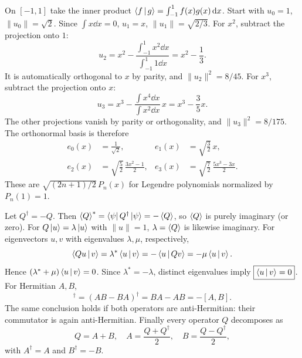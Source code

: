 On $[-1,1]$ take the inner product
$\left\langle f\,\middle|\,g\right\rangle=\int_{-1}^1 f(x)g(x)\,\mathrm{d} x$.
Start with $u_0=1$, $\|u_0\|=\sqrt2$.
Since $\int x\dd x=0$, $u_1=x$,
$\|u_1\|=\sqrt{2/3}$.
For $x^2$, subtract the projection onto $1$:
\begin{equation}
u_2=x^2-\frac{\int_{-1}^1x^2\dd x}
{\int_{-1}^1 1\dd x}=x^2-\frac13.
\end{equation}
It is automatically orthogonal to $x$ by parity,
and $\|u_2\|^2=8/45$.
For $x^3$, subtract the projection onto $x$:
\begin{equation}
u_3=x^3-\frac{\int x^4\dd x}
{\int x^2\dd x}\,x=x^3-\frac35x.
\end{equation}
The other projections vanish by parity or
orthogonality, and $\|u_3\|^2=8/175$.
The orthonormal basis is therefore
\begin{align}
\boxed{e_0(x)}&=\frac1{\sqrt2},&
\boxed{e_1(x)}&=\sqrt{\frac32}\,x,\\
\boxed{e_2(x)}&=\sqrt{\frac52}\,
\frac{3x^2-1}{2},&
\boxed{e_3(x)}&=\sqrt{\frac72}\,
\frac{5x^3-3x}{2}.
\end{align}
These are $\sqrt{(2n+1)/2}\,P_n(x)$
for Legendre polynomials normalized by $P_n(1)=1$.

Let $Q^\dagger=-Q$.
Then
$\left\langle Q\right\rangle^*=\left\langle\psi\right| Q^\dagger\left|\psi\right\rangle=-\left\langle Q\right\rangle$,
so $\left\langle Q\right\rangle$ is purely imaginary (or zero).
For $Q\left|u\right\rangle=\lambda\left|u\right\rangle$ with $\|u\|=1$,
$\lambda=\left\langle Q\right\rangle$ is likewise imaginary.
For eigenvectors $u,v$ with eigenvalues
$\lambda,\mu$, respectively,
\begin{equation}
\left\langle Qu\,\middle|\,v\right\rangle=\lambda^*\left\langle u\,\middle|\,v\right\rangle
=-\left\langle u\,\middle|\,Qv\right\rangle=-\mu\left\langle u\,\middle|\,v\right\rangle.
\end{equation}
Hence $(\lambda^*+\mu)\left\langle u\,\middle|\,v\right\rangle=0$.
Since $\lambda^*=-\lambda$,
distinct eigenvalues imply
$\boxed{\left\langle u\,\middle|\,v\right\rangle=0}$.
For Hermitian $A,B$,
\begin{equation}
[A,B]^\dagger=(AB-BA)^\dagger=BA-AB=-[A,B].
\end{equation}
The same conclusion holds if both operators
are anti-Hermitian: their commutator is
again anti-Hermitian.
Finally every operator $Q$ decomposes as
\begin{equation}
\boxed{Q=A+B,\quad A=\frac{Q+Q^\dagger}{2},
\quad B=\frac{Q-Q^\dagger}{2}},
\end{equation}
with $A^\dagger=A$ and $B^\dagger=-B$.

